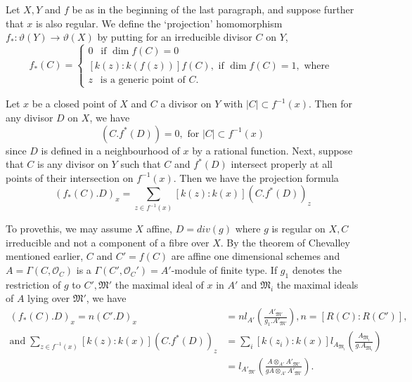 Let $X,Y$ and $f$ be as in the beginning of the last paragraph, and
suppose further that $x$ is also regular. We define the `projection'
homomorphism $f_* : \vartheta (Y) \to \vartheta (X)$ by putting for an
irreducible divisor $C$ on $Y$,  
\begin{equation*} 
  f_* (C) = 
  \begin{cases}
    0 ~~\text{ if } \dim f(C) = 0 \\
    [k(z): k (f(z))] f (C) , \text { if } \dim f(C) = 1, \text{ where }\\
    z ~~\text{ is a generic point of } C.
  \end{cases}
\end{equation*}

Let $x$ be a closed point of $X$ and $C$ a divisor on $Y$ with $|C|
\subset f^{-1} (x)$. Then for any divisor $D$ on $X$, we have  
\begin{equation*}
(C.f^* (D)) = 0, \text { for } | C |  \subset f^{-1}
  (x)\tag{6}\label{chap6:eq6} 
\end{equation*}
since $D$ is defined in a neighbourhood of $x$ by a rational
function. Next, suppose that $C$ is any divisor on $Y$ such that $C$
and $f^* (D)$ intersect properly at all points of their intersection
on $f^{-1}(x)$. Then we have the projection formula  
\begin{equation*}
  (f_*(C).D)_x = \sum_{z \in f^{-1}(x)} [k(z):k(x)] (C.f^*
  (D))_z\tag{7}\label{chap6:eq7} 
\end{equation*}

To prove\pageoriginale  this, we may assume $X$ affine, $D =  div
(g)$ where $g$ is 
regular on $X,C$ irreducible and not a component of a fibre over
$X$. By the theorem of Chevalley mentioned earlier, $C$ and $C' =
f(C)$ are affine one dimensional schemes and $A
= \Gamma(C,\mathscr{O}_C)$ is a $\Gamma(C',\mathscr{O}_C') =
A'$-module of finite type. If $g_1$ denotes the restriction of $g$ to 
$C',\mathfrak{M}'$ the maximal ideal of $x$ in $A'$ and $\mathfrak{M}_i$
the maximal ideals of $A$ lying over $\mathfrak{M}'$, we have 
\begin{align*}
  (f_*(C).D)_x = n(C'.D)_x & = n
  l_{A'}
  \left(\frac{A'_{\mathfrak{M}'}}{g_1.A'_{\mathfrak{M}'}}\right),n=[R(C)
    : R(C')],\\  
  \text{and}\;  
  \sum_{z\in f^{-1}(x)} [k(z):k(x)] (C.f^*(D))_z & =
  \sum_i[k(z_i):k(x)] l_{A_{\mathfrak{M}_i}}
  \left(\frac{A_{\mathfrak{M}_i}}{g.A_{\mathfrak{M}_i}}\right)\\ 
  & =  l_{A'_{\mathfrak{M}'}} \left(\frac{A\otimes_{{A}'}A'
    _{\mathfrak{M}'}}{g A\otimes_{{A}'}A'_{\mathfrak{M}'}}\right). 
\end{align*}

